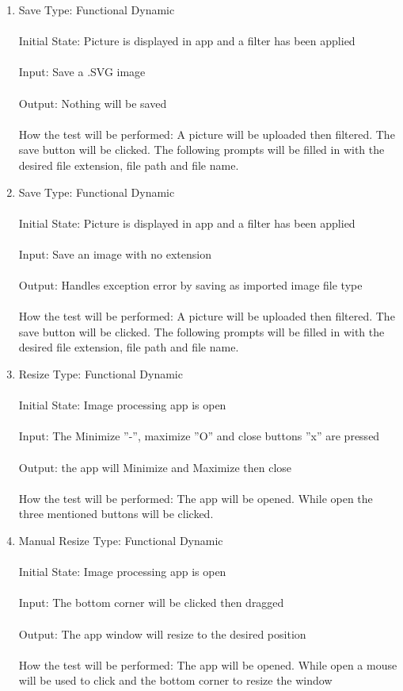 \documentclass[12pt, titlepage]{article}
\begin{document}
\begin{enumerate}
\item{Save}
Type: Functional Dynamic \\ \\
Initial State: Picture is displayed in app and a filter has been applied \\ \\
Input: Save a .SVG image \\ \\
Output: Nothing will be saved \\ \\
How the test will be performed: A picture will be uploaded then filtered. The save button will be clicked. The following prompts will be filled in with the desired file extension, file path and file name.

\item{Save}
Type: Functional Dynamic \\ \\
Initial State: Picture is displayed in app and a filter has been applied \\ \\
Input: Save an image with no extension \\ \\
Output: Handles exception error by saving as imported image file type  \\ \\
How the test will be performed: A picture will be uploaded then filtered. The save button will be clicked. The following prompts will be filled in with the desired file extension, file path and file name.

\item{Resize}
Type: Functional Dynamic \\ \\
Initial State: Image processing app is open \\ \\
Input: The Minimize ''-'', maximize ''O'' and close buttons ''x'' are pressed \\ \\
Output: the app will Minimize and Maximize then close \\ \\
How the test will be performed: The app will be opened. While open the three mentioned buttons will be clicked.

\item{Manual Resize}
Type: Functional Dynamic \\ \\
Initial State: Image processing app is open \\ \\
Input: The bottom corner will be clicked then dragged \\ \\
Output: The app window will resize to the desired position \\ \\
How the test will be performed: The app will be opened. While open a mouse will be used to click and the bottom corner to resize the window
 

\end{enumerate}
\end{document}
